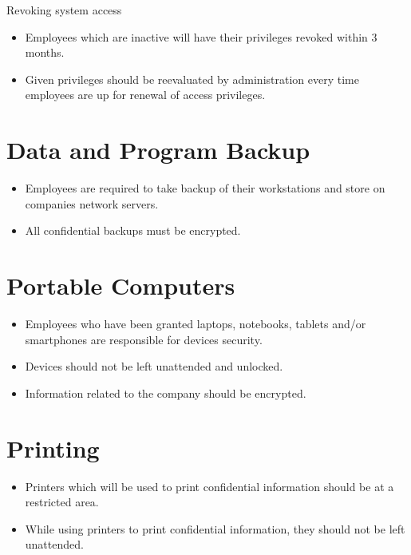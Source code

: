 Revoking system access
    \begin{itemize}[noitemsep]
        \item Employees which are inactive will have their privileges revoked within 3 months.
        \item Given privileges should be reevaluated by administration every time employees are up for renewal of access privileges.
    \end{itemize}

\section{Data and Program Backup}

    \begin{itemize}[noitemsep]
        \item Employees are required to take backup of their workstations and store on companies network servers.
        \item All confidential backups must be encrypted.

    \end{itemize}
    

\section{Portable Computers}

    \begin{itemize}[noitemsep]
        \item Employees who have been granted laptops, notebooks, tablets and/or smartphones are responsible for devices security.
        \item Devices should not be left unattended and unlocked.
        \item Information related to the company should be encrypted.

    \end{itemize}{}
    

\section{Printing}

    \begin{itemize}[noitemsep]
        \item Printers which will be used to print confidential information should be at a restricted area.
        \item While using printers to print confidential information, they should not be left unattended.

    \end{itemize}{}
    

